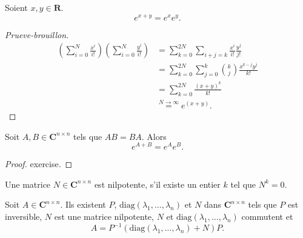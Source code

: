\begin{reminder}
\begin{lemma}
Soient $x,y\in \mathbf{R}$. 
$$
e^{x+y}=e^{ x }e^{ y }.
$$
\end{lemma}
\begin{proof}[Prueve-brouillon]
\begin{align*}
\left( \sum_{i=0}^{N} \frac{x^{i}}{i!} \right)\left( \sum_{i=0}^{N} \frac{y^{i}}{i!} \right) & =\sum_{k=0}^{2N} \sum _{i+j=k} \frac{x^{i}}{i!} \frac{y^{j}}{j!} \\
 & =\sum_{k=0}^{2N} \sum_{j=0}^{k} \binom{ k}{j } \frac{x^{k-j}y^{j}}{k!} \\
 & =\sum_{k=0}^{2N} \frac{(x+y)^{k}}{k!} \\
 & \overset{N\to \infty}=e^{(x+y)}. 
\end{align*}
\end{proof}
\end{reminder}
\begin{lemma}
Soit $A,B\in \mathbf{C}^{n\times n}$ tels que $AB=BA$. Alors
$$
e^{A+B}=e^{ A }e^{ B }.
$$
\end{lemma}
\begin{proof}
exercise.
\end{proof}
\begin{definition}
Une matrice $N\in \mathbf{C}^{n\times n}$ est nilpotente, s'il existe un entier $k$ tel que $N^{k}=0$.
\end{definition}
\begin{theorem}
Soit $A\in \mathbf{C}^{n\times n}$. Ils existent $P$, $\mathrm{diag}(\lambda_{1},\dots,\lambda _{n})$ et $N$ dans $\mathbf{C}^{n\times n}$ tels que $P$ est inversible, $N$ est une matrice nilpotente, $N$ et $\mathrm{diag}(\lambda_{1},\dots,\lambda _{n})$ commutent et 
$$
A=P^{-1}(\mathrm{diag}(\lambda_{1},\dots,\lambda _{n})+N)P.
$$
\end{theorem}

